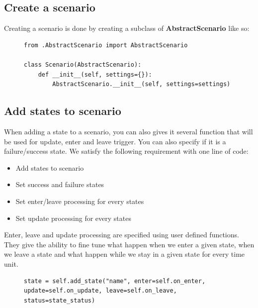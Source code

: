 \documentclass[12pt]{article}
\theoremstyle{definition}
\theoremstyle{definition}
\theoremstyle{remark}
\begin{document}
\subsection{Create a scenario}

Creating a scenario is done by creating a subclass of \textbf{AbstractScenario} like so:

\begin{figure}[H]
    \begin{lstlisting}[caption="Creating a scenario",label={lst:python-create-scenario}]
from .AbstractScenario import AbstractScenario

class Scenario(AbstractScenario):
    def __init__(self, settings={}):
        AbstractScenario.__init__(self, settings=settings)
    \end{lstlisting}
\end{figure}


\subsection{Add states to scenario}

When adding a state to a scenario, you can also gives it several function that will be used for update, enter and leave trigger. You can also specify if it is a failure/success state. We satisfy the following requirement with one line of code:
\begin{itemize}
\item Add states to scenario
\item Set success and failure states
\item Set enter/leave processing for every states
\item Set update processing for every states
\end{itemize}

Enter, leave and update processing are specified using user defined functions. They give the ability to fine tune what happen when we enter a given state, when we leave a state and what happen while we stay in a given state for every time unit.

\begin{figure}[H]
    \begin{lstlisting}[caption="Add states",label={lst:python-add-state}]
state = self.add_state("name", enter=self.on_enter, update=self.on_update, leave=self.on_leave, status=state_status)
    \end{lstlisting}
\end{figure}
\end{document}
